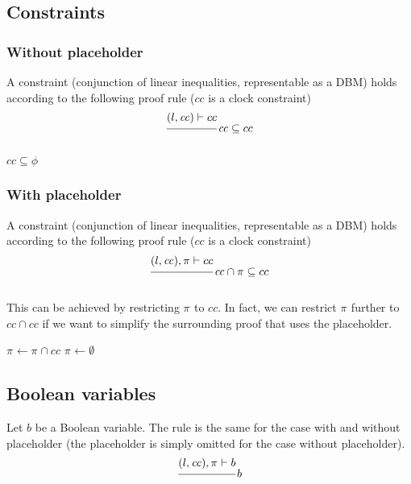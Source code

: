 \documentclass{article}
\newcommand{\proofrule}[3][]{#1 \frac{\raisebox{.7ex}{\normalsize{$#2$}}}
  {\raisebox{-1.0ex}{\normalsize{$#3$}}}}
\newcommand{\placeholder}[1][]{\pi_{#1}}
\newcommand{\loc}{l}
\newcommand{\region}{\mathit{cc}}
\newcommand{\method}[1]{\ensuremath{\mathbf{#1}}}
\begin{document}
\subsection{Constraints}

\subsubsection{Without placeholder}
A constraint (conjunction of linear inequalities, representable as a DBM) holds according to the following proof rule ($cc$ is a clock constraint)
\[
  \proofrule
  {(\loc, \region) \vdash cc}
  {}
  \region \subseteq cc
\]

\begin{algorithm}[H]
  \caption{$\method{do\_proof\_constraint}(\loc, \region, \phi)$}
  \begin{algorithmic}
  \RETURN $\region \subseteq \phi$
\end{algorithmic}
\end{algorithm}

\subsubsection{With placeholder}
A constraint (conjunction of linear inequalities, representable as a DBM) holds according to the following proof rule ($cc$ is a clock constraint)
\[
  \proofrule
  {(\loc, \region), \placeholder \vdash cc}
  {}
  \region \cap \placeholder \subseteq cc
\]

This can be achieved by restricting $\placeholder$ to $cc$. In fact, we can restrict $\placeholder$ further to $cc \cap \region$ if we want to simplify the surrounding proof that uses the placeholder.
\begin{algorithm}[H]
  \caption{$\method{do\_proof\_place\_constraint}(\loc, \region, \placeholder, \phi)$}
  \begin{algorithmic}
  \IF{$\region \not \subseteq cc$}
    \STATE $\placeholder \gets \placeholder \cap cc$
    \IF{$\placeholder \cap \region = \emptyset$}
      \STATE $\placeholder \gets \emptyset$
    \ENDIF
  \ENDIF
\end{algorithmic}
\end{algorithm}


\subsection{Boolean variables}

Let $b$ be a Boolean variable. The rule is the same for the case with and without placeholder (the placeholder is simply omitted for the case without placeholder).
\[
  \proofrule
  {(\loc, \region), \placeholder \vdash b}
  {}
  b
\]
\end{document}
